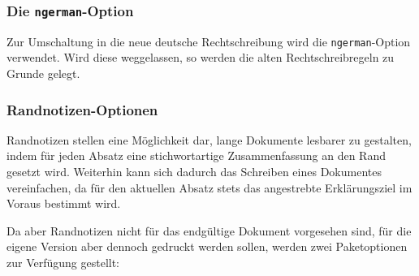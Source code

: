 \documentclass[english, trackchanges, hyperref, ngerman ,pdf, mp, mppdf]{wise}
\newcommand\code[1]{\texttt{#1}}
\begin{document}

\subsubsection{Die \code{ngerman}-Option }

Zur Umschaltung in die neue deutsche Rechtschreibung wird die \code{ngerman}-Option
verwendet. Wird diese weggelassen, so werden die alten Rechtschreibregeln
zu Grunde gelegt.


\subsubsection{Randnotizen-Optionen}

Randnotizen stellen eine Möglichkeit dar, lange Dokumente lesbarer
zu gestalten, indem für jeden Absatz eine stichwortartige Zusammenfassung
an den Rand gesetzt wird. Weiterhin kann sich dadurch das Schreiben
eines Dokumentes vereinfachen, da für den aktuellen Absatz stets das
angestrebte Erklärungsziel im Voraus bestimmt wird.

Da aber Randnotizen nicht für das endgültige Dokument vorgesehen sind,
für die eigene Version aber dennoch gedruckt werden sollen, werden
zwei Paketoptionen zur Verfügung gestellt:
\end{document}
